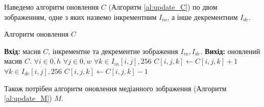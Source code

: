Наведемо алгоритм оновлення $C$ (Алгоритм \ref{al:update_C}) по двом зображенням,
одне з яких назвемо інкрементним $I_{in}$, а інше декрементним $I_{de}$.

\begin{algorithm}[H]
    \caption{Алгоритм оновлення $C$}
    \begin{algorithmic}
        \State \textbf{Вхід:} масив $C$, інкрементне та декрементне зображення $I_{in}, I_{de}$.
        \State \textbf{Вихід:} оновлений масив $C$.
        \State $\forall i \in \overline{0,h}$
        \State \qquad  $\forall j \in \overline{0,w}$
        \State \qquad \qquad $\forall k \in \overline{I_{in}[i,j],256}$
        \State \qquad \qquad \qquad $C[i,j,k] \gets C[i,j,k] + 1$
        \State \qquad \qquad $\forall k \in \overline{I_{de}[i,j],256}$
        \State \qquad \qquad \qquad $C[i,j,k] \gets C[i,j,k] - 1$
    \end{algorithmic}
    \label{al:update_C}
\end{algorithm}

Також потрібен алгоритм оновлення медіанного зображення (Алгоритм \ref{al:update_M}) $M$.

